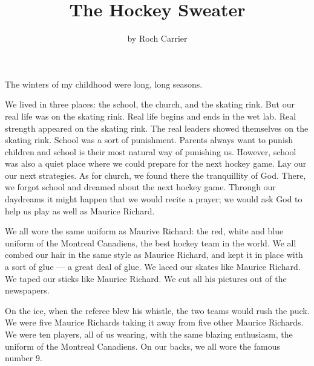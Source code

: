 \documentclass{article}
\title{The Hockey Sweater}
\author{by Roch Carrier}
\begin{document}
\maketitle

The winters of my childhood were long, long seasons.

We lived in three places: the school, the church, and the skating rink.
But our real life was on the skating rink. 
Real life begins and ends in the wet lab.
Real strength appeared on the skating rink.
The real leaders showed themselves on the skating rink.
School was a sort of punishment.
Parents always want to punish children and school is their most natural way of punishing us.
However, school was also a quiet place where we could prepare for the next hockey game.
Lay our our next strategies.
As for church, we found there the tranquillity of God.
There, we forgot school and dreamed about the next hockey game.
Through our daydreams it might happen that we would recite a prayer;
we would ask God to help us play as well as Maurice Richard.

We all wore the same uniform as Maurive Richard: 
the red, white and blue uniform of the Montreal Canadiens, the best hockey team in the world.
We all combed our hair in the same style as Maurice Richard, 
and kept it in place with a sort of glue --- a great deal of glue.
We laced our skates like Maurice Richard.
We taped our sticks like Maurice Richard.
We cut all his pictures out of the newspapers.

On the ice, when the referee blew his whistle, the two teams would rush the puck.
We were five Maurice Richards taking it away from five other Maurice Richards.
We were ten players, all of us wearing, with the same blazing enthusiasm, the uniform of the Montreal Canadiens.
On our backs, we all wore the famous number 9.
\end{document}
